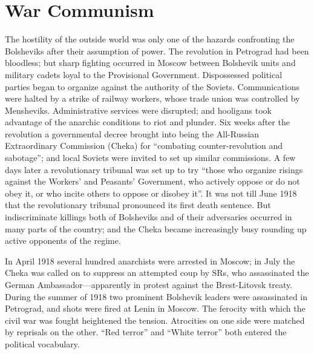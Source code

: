 \chapter{War Communism}

The hostility of the outside world was only one of the hazards confronting the Bolsheviks after their assumption of power. The revolution in Petrograd had been bloodless; but sharp fighting occurred in Moscow between Bolshevik units and military cadets loyal to the Provisional Government. Dispossessed political parties began to organize against the authority of the Soviets. Communications were halted by a strike of railway workers, whose trade union was controlled by Mensheviks. Administrative services were disrupted; and hooligans took advantage of the anarchic conditions to riot and plunder. Six weeks after the revolution a governmental decree brought into being the All-Russian Extraordinary Commission (Cheka) for ``combating counter-revolution and sabotage''; and local Soviets were invited to set up similar commissions. A few days later a revolutionary tribunal was set up to try ``those who organize risings against the Workers' and Peasants' Government, who actively oppose or do not obey it, or who incite others to oppose or disobey it''. It was not till June 1918 that the revolutionary tribunal pronounced its first death sentence. But indiscriminate killings both of Bolsheviks and of their adversaries occurred in many parts of the country; and the Cheka became increasingly busy rounding up active opponents of the regime. 

In April 1918 several hundred anarchists were arrested in Moscow; in July the Cheka was called on to suppress an attempted coup by SRs, who assassinated the German Ambassador---apparently in protest against the Brest-Litovsk treaty. During the summer of 1918 two prominent Bolshevik leaders were assassinated in Petrograd, and shots were fired at Lenin in Moscow. The ferocity with which the civil war was fought heightened the tension. Atrocities on one side were matched by reprisals on the other. ``Red terror'' and ``White terror'' both entered the political vocabulary. 

